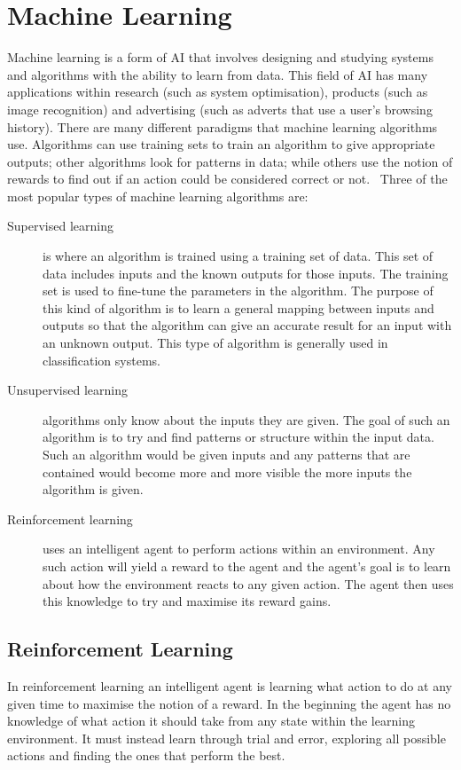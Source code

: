\chapter{Machine Learning}\label{machine learning}
Machine learning is a form of \ac{AI} that involves designing and studying systems and algorithms with the ability to learn from data. This field of AI has many applications within research (such as system optimisation), products (such as image recognition) and advertising (such as adverts that use a user's browsing history). There are many different paradigms that machine learning algorithms use. Algorithms can use training sets to train an algorithm to give appropriate outputs; other algorithms look for patterns in data; while others use the notion of rewards to find out if an action could be considered correct or not.~\cite{alpaydin2010introduction} Three of the most popular types of machine learning algorithms are:
\begin{description}
  \item[Supervised learning] is where an algorithm is trained using a training set of data. This set of data includes inputs and the known outputs for those inputs. The training set is used to fine-tune the parameters in the algorithm. The purpose of this kind of algorithm is to learn a general mapping between inputs and outputs so that the algorithm can give an accurate result for an input with an unknown output. This type of algorithm is generally used in classification systems.  
  \item[Unsupervised learning] algorithms only know about the inputs they are given. The goal of such an algorithm is to try and find patterns or structure within the input data. Such an algorithm would be given inputs and any patterns that are contained would become more and more visible the more inputs the algorithm is given.
  \item[Reinforcement learning] uses an intelligent agent to perform actions within an environment. Any such action will yield a reward to the agent and the agent's goal is to learn about how the environment reacts to any given action. The agent then uses this knowledge to try and maximise its reward gains.
\end{description}
\section{Reinforcement Learning}\label{reinforcement learning}
In reinforcement learning an intelligent agent is learning what action to do at any given time to maximise the notion of a reward. In the beginning the agent has no knowledge of what action it should take from any state within the learning environment. It must instead learn through trial and error, exploring all possible actions and finding the ones that perform the best.

